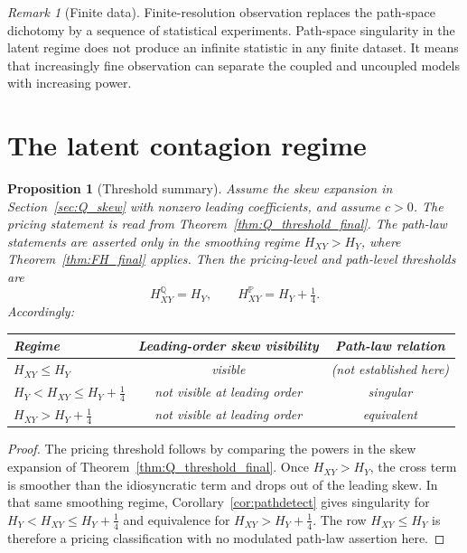 \documentclass[11pt,a4paper]{amsart}
\theoremstyle{plain}
\newtheorem{proposition}[theorem]{Proposition}
\theoremstyle{definition}
\theoremstyle{remark}
\newtheorem{remark}[theorem]{Remark}
\newcommand{\Q}{\mathbb{Q}}
\newcommand{\PP}{\mathbb{P}}
\begin{document}
\begin{remark}[Finite data]\label{rem:practical}
Finite-resolution observation replaces the path-space dichotomy by a sequence of statistical
experiments.  Path-space singularity in the latent regime does not produce an infinite statistic in
any finite dataset.  It means that increasingly fine observation can separate the coupled and
uncoupled models with increasing power.
\end{remark}

\section{The latent contagion regime}\label{sec:latent}

\begin{proposition}[Threshold summary]\label{prop:regime}
Assume the skew expansion in Section~\ref{sec:Q_skew} with nonzero leading coefficients, and assume $c>0$. The pricing statement is read from Theorem~\ref{thm:Q_threshold_final}. The path-law statements are asserted only in the smoothing regime $H_{XY}>H_Y$, where Theorem~\ref{thm:FH_final} applies. Then the pricing-level and path-level thresholds are
\[
H_{XY}^{\Q}=H_Y,
\qquad
H_{XY}^{\PP}=H_Y+\tfrac14.
\]
Accordingly:
\begin{center}
\begin{tabular}{@{}lcc@{}}
\toprule
Regime & Leading-order skew visibility & Path-law relation \\
\midrule
$H_{XY}\le H_Y$ & visible & (not established here) \\
$H_Y<H_{XY}\le H_Y+\tfrac14$ & not visible at leading order & singular \\
$H_{XY}>H_Y+\tfrac14$ & not visible at leading order & equivalent \\
\bottomrule
\end{tabular}
\end{center}
\end{proposition}

\begin{proof}
The pricing threshold follows by comparing the powers in the skew expansion of
Theorem~\ref{thm:Q_threshold_final}. Once $H_{XY}>H_Y$, the cross term is smoother than the
idiosyncratic term and drops out of the leading skew. In that same smoothing regime,
Corollary~\ref{cor:pathdetect} gives singularity for $H_Y<H_{XY}\le H_Y+\tfrac14$ and equivalence
for $H_{XY}>H_Y+\tfrac14$. The row $H_{XY}\le H_Y$ is therefore a pricing classification with no
modulated path-law assertion here.
\end{proof}
\end{document}
